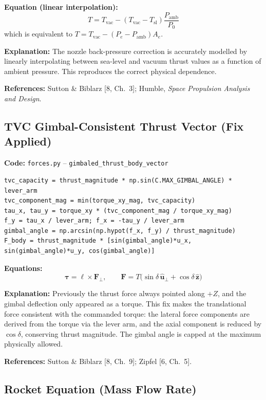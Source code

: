 \documentclass[12pt,a4paper]{article}
\begin{document}
\textbf{Equation (linear interpolation):}
\[
T = T_{\text{vac}} - (T_{\text{vac}} - T_{\text{sl}})\frac{P_{\text{amb}}}{P_0}
\]
which is equivalent to $T = T_{\text{vac}} - (P_e - P_{\text{amb}})A_e$.

\textbf{Explanation:} The nozzle back-pressure correction is accurately modelled by linearly interpolating between sea-level and vacuum thrust values as a function of ambient pressure. This reproduces the correct physical dependence.

\textbf{References:} Sutton \& Biblarz [8, Ch.~3]; Humble, \textit{Space Propulsion Analysis and Design}.

\subsection{TVC Gimbal-Consistent Thrust Vector (Fix Applied)}

\textbf{Code:} \texttt{forces.py} – \texttt{gimbaled\_thrust\_body\_vector}
\begin{verbatim}
tvc_capacity = thrust_magnitude * np.sin(C.MAX_GIMBAL_ANGLE) * lever_arm
tvc_component_mag = min(torque_xy_mag, tvc_capacity)
tau_x, tau_y = torque_xy * (tvc_component_mag / torque_xy_mag)
f_y = tau_x / lever_arm; f_x = -tau_y / lever_arm
gimbal_angle = np.arcsin(np.hypot(f_x, f_y) / thrust_magnitude)
F_body = thrust_magnitude * [sin(gimbal_angle)*u_x, sin(gimbal_angle)*u_y, cos(gimbal_angle)]
\end{verbatim}

\textbf{Equations:}
\[
\boldsymbol{\tau} = \boldsymbol{\ell} \times \mathbf{F}_{\perp},\qquad
\mathbf{F} = T\bigl(\sin\delta\,\hat{\mathbf{u}}_{\perp} + \cos\delta\,\hat{\mathbf{z}}\bigr)
\]

\textbf{Explanation:} Previously the thrust force always pointed along $+Z$, and the gimbal deflection only appeared as a torque. This fix makes the translational force consistent with the commanded torque: the lateral force components are derived from the torque via the lever arm, and the axial component is reduced by $\cos\delta$, conserving thrust magnitude. The gimbal angle is capped at the maximum physically allowed.

\textbf{References:} Sutton \& Biblarz [8, Ch.~9]; Zipfel [6, Ch.~5].

\subsection{Rocket Equation (Mass Flow Rate)}
\end{document}
